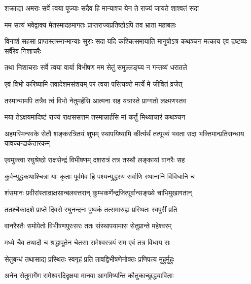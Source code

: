 \twolineshloka
{शक्राद्या अमराः सर्वे त्वया पूज्याः सदैव हि}
{मान्याश्च येन ते राज्यं जायते शाश्वतं सदा}%

\twolineshloka
{मम सत्यं भवेद्वाक्य मेतस्मादहमागतः}
{प्राप्तराज्यप्रतिष्ठोऽपि तव भ्राता महाबलः}%

\threelineshloka
{विनाशं सहसा प्राप्तस्तस्मान्मान्याः सुराः सदा}
{यदि कश्चित्समायाति मानुषोऽत्र कथञ्चन}
{मत्काय एव द्रष्टव्यः सर्वैरेव निशाचरैः}%

\twolineshloka
{तथा निशाचराः सर्वे त्वया वार्या विभीषण}
{मम सेतुं समुल्लङ्घ्य न गन्तव्यं धरातले}%


\twolineshloka
{एवं विभो करिष्यामि तवादेशमसंशयम्}
{परं त्वया परित्यक्ते मर्त्ये मे जीवितं व्रजेत्}%

\twolineshloka
{तस्मान्मामपि तत्रैव त्वं विभो नेतुमर्हसि}
{आत्मना सह यत्रास्ते प्राग्गतो लक्ष्मणस्तव}%


\twolineshloka
{मया तेऽक्षयमादिष्टं राज्यं राक्षससत्तम}
{तस्मान्नार्हसि मां कर्तुं मिथ्याचारं कथञ्चन}%

\threelineshloka
{अहमस्मिन्स्वके सेतौ शङ्करत्रितयं शुभम्}
{स्थापयिष्यामि कीर्त्यर्थं तत्पूज्यं भवता सदा}
{भक्तिमान्प्रतिसन्धाय यावच्चन्द्रार्कतारकम्}%

\twolineshloka
{एवमुक्त्वा रघुश्रेष्ठो राक्षसेन्द्रं विभीषणम्}
{दशरात्रं तत्र तस्थौ लङ्कायां वानरैः सह}%

\twolineshloka
{कुर्वन्युद्धकथाश्चित्रा याः कृताः पूर्वमेव हि}
{पश्यन्युद्धस्य सर्वाणि स्थानानि विविधानि च}%

\twolineshloka
{शंसमानः प्रवीरांस्तान्राक्षसान्बलवत्तरान्}
{कुम्भकर्णेन्द्रजित्पूर्वान्सङ्ख्ये चाभिमुखागतान्}%

\twolineshloka
{ततश्चैकादशे प्राप्ते दिवसे रघुनन्दनः}
{पुष्पकं तत्समारुह्य प्रस्थितः स्वपुरीं प्रति}%

\twolineshloka
{वानरैस्तैः समोपेतो विभीषणपुरःसरः}
{ततः संस्थापयामास सेतुप्रान्ते महेश्वरम्}%

\twolineshloka
{मध्ये चैव तथादौ च श्रद्धापूतेन चेतसा}
{रामेश्वरत्रयं राम एवं तत्र विधाय सः}%

\twolineshloka
{सेतुबन्धं तथासाद्य प्रस्थितः स्वगृहं प्रति}
{तावद्विभीषणेनोक्तः प्रणिपत्य मुहुर्मुहुः}%


\twolineshloka
{अनेन सेतुमार्गेण रामेश्वरदिदृक्षया}
{मानवा आगमिष्यन्ति कौतुकाच्छ्रद्धयाविताः}%

